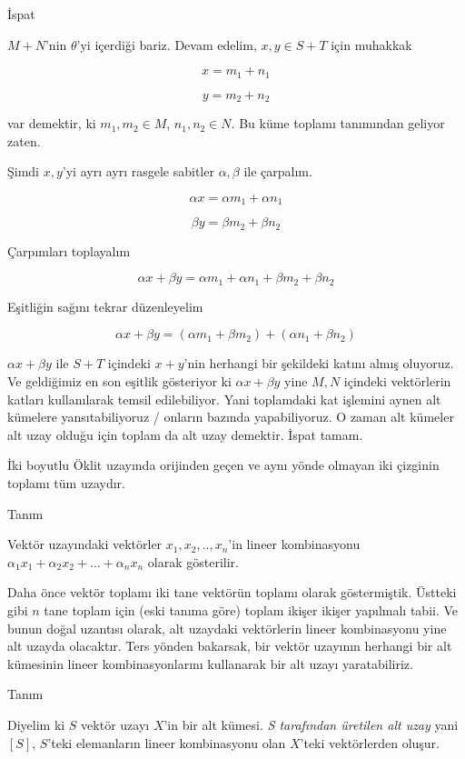 \documentclass[12pt,fleqn]{article}\usepackage{../../common}
\begin{document}
İspat 

$M+N$'nin $\theta$'yi içerdiği bariz. Devam edelim, $x,y \in S+T$ için
muhakkak 

$$ x = m_1 + n_1 $$

$$ y = m_2 + n_2 $$

var demektir, ki $m_1,m_2 \in M$, $n_1,n_2 \in N$. Bu küme toplamı
tanımından geliyor zaten. 

Şimdi $x,y$'yi ayrı ayrı rasgele sabitler $\alpha,\beta$ ile çarpalım. 

$$ \alpha x = \alpha m_1 + \alpha n_1 $$

$$ \beta y = \beta m_2 + \beta n_2 $$

Çarpımları toplayalım

$$ \alpha x + \beta y  = \alpha m_1 + \alpha n_1 + \beta m_2 + \beta n_2 $$

Eşitliğin sağını tekrar düzenleyelim

$$  \alpha x + \beta y  = (\alpha m_1 + \beta m_2) + (\alpha n_1  + \beta n_2 )$$

$\alpha x + \beta y $ ile $S+T$ içindeki $x+y$'nin herhangi bir şekildeki
katını almış oluyoruz. Ve geldiğimiz en son eşitlik gösteriyor 
ki $\alpha x + \beta y$ yine $M,N$ içindeki vektörlerin katları kullanılarak 
temsil edilebiliyor. Yani toplamdaki kat işlemini aynen alt kümelere
yansıtabiliyoruz / onların bazında yapabiliyoruz. O zaman alt kümeler alt
uzay olduğu için toplam da alt uzay demektir. İspat tamam.

İki boyutlu Öklit uzayında orijinden geçen ve aynı yönde olmayan iki çizginin
toplamı tüm uzaydır. 

Tanım

Vektör uzayındaki vektörler $x_1,x_2,..,x_n$'in lineer kombinasyonu
$\alpha_1 x_1 + \alpha_2 x_2 + ... + \alpha_n x_n$ olarak gösterilir. 

Daha önce vektör toplamı iki tane vektörün toplamı olarak
göstermiştik. Üstteki gibi $n$ tane toplam için (eski tanıma göre) toplam
ikişer ikişer yapılmalı tabii. Ve bunun doğal uzantısı olarak, alt
uzaydaki vektörlerin lineer kombinasyonu yine alt uzayda olacaktır. Ters
yönden bakarsak, bir vektör uzayının herhangi bir alt kümesinin lineer
kombinasyonlarını kullanarak bir alt uzayı yaratabiliriz. 

Tanım

Diyelim ki $S$ vektör uzayı $X$'in bir alt kümesi. {\em S tarafından
  üretilen alt uzay} yani $[S]$, $S$'teki elemanların lineer
kombinasyonu olan $X$'teki vektörlerden oluşur. 
\end{document}
